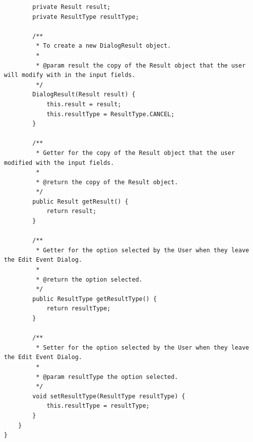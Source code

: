 \begin{lstlisting}
        private Result result;
        private ResultType resultType;

        /**
         * To create a new DialogResult object.
         *
         * @param result the copy of the Result object that the user will modify with in the input fields.
         */
        DialogResult(Result result) {
            this.result = result;
            this.resultType = ResultType.CANCEL;
        }

        /**
         * Getter for the copy of the Result object that the user modified with the input fields.
         *
         * @return the copy of the Result object.
         */
        public Result getResult() {
            return result;
        }

        /**
         * Getter for the option selected by the User when they leave the Edit Event Dialog.
         *
         * @return the option selected.
         */
        public ResultType getResultType() {
            return resultType;
        }

        /**
         * Setter for the option selected by the User when they leave the Edit Event Dialog.
         *
         * @param resultType the option selected.
         */
        void setResultType(ResultType resultType) {
            this.resultType = resultType;
        }
    }
}
\end{lstlisting}
